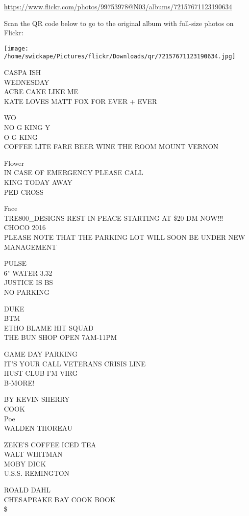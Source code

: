 \documentclass[10pt,letterpaper]{article}
\begin{document}
\url{https://www.flickr.com/photos/99753978@N03/albums/72157671123190634}

Scan the QR code below to go to the original album with full-size photos on Flickr:

\texttt{[image: /home/swickape/Pictures/flickr/Downloads/qr/72157671123190634.jpg]}
\pagebreak

CASPA ISH\\
WEDNESDAY\\
ACRE CAKE LIKE ME\\
KATE LOVES MATT FOX FOR EVER + EVER

WO\\
NO G KING Y\\
O G KING\\
COFFEE LITE FARE BEER WINE THE ROOM MOUNT VERNON

Flower\\
IN CASE OF EMERGENCY PLEASE CALL\\
KING TODAY AWAY\\
PED CROSS

Face\\
TRE800\_DESIGNS REST IN PEACE STARTING AT \$20 DM NOW!!!\\
CHOCO 2016\\
PLEASE NOTE THAT THE PARKING LOT WILL SOON BE UNDER NEW MANAGEMENT

PULSE\\
6" WATER 3.32\\
JUSTICE IS BS\\
NO PARKING

DUKE\\
BTM\\
ETHO BLAME HIT SQUAD\\
THE BUN SHOP OPEN 7AM{-}11PM

GAME DAY PARKING\\
IT'S YOUR CALL VETERANS CRISIS LINE\\
HUST CLUB I'M VIRG\\
B{-}MORE!

BY KEVIN SHERRY\\
COOK\\
Poe\\
WALDEN THOREAU

ZEKE'S COFFEE ICED TEA\\
WALT WHITMAN\\
MOBY DICK\\
U.S.S. REMINGTON

ROALD DAHL\\
CHESAPEAKE BAY COOK BOOK\\
\$
\end{document}
